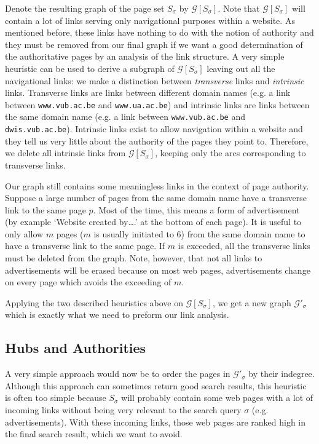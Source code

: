 \documentclass[a4paper,11pt]{report}
\newcommand{\graf}{\mathscr{G}}
\begin{document}
Denote the resulting graph of the page set $S_\sigma$ by $\graf[S_\sigma]$. Note that $\graf[S_\sigma]$ will 
contain 
a lot of links serving only navigational purposes within a website. As mentioned 
before, these links have nothing to do with the notion of authority and they must be 
removed from our final graph if we want a good determination of  the authoritative pages by an analysis of
 the link structure.  A very simple heuristic can be used to derive a subgraph 
 of $\graf[S_\sigma]$ leaving out all the navigational links: we make a 
 distinction between \emph{transverse} links and \emph{intrinsic} links. 
 Transverse links are links between different domain names (e.g. a link between \texttt{www.vub.ac.be} and
 \texttt{www.ua.ac.be}) and intrinsic links are links between the same domain 
 name (e.g. a link between \texttt{www.vub.ac.be} and
 \texttt{dwis.vub.ac.be}). Intrinsic links exist to allow navigation within a 
 website and they tell us very little about the authority of the pages they 
 point to. Therefore, we delete all intrinsic links from  $\graf[S_\sigma]$, 
 keeping only the arcs corresponding to transverse links.
 
Our graph still contains some meaningless links in the context of page 
 authority. Suppose a large number of pages from the same domain name have a transverse link to 
 the same page $p$. Most of the time, this means a form of advertisement (by example `Website created by\ldots.' at the bottom of each page). It is useful 
 to only allow $m$ pages ($m$ is usually initiated to 6) from the same domain name to have a transverse link to the same page. 
 If $m$ is exceeded, all the transverse links must be deleted from the graph. Note, 
 however, that not all links to advertisements will be erased because on most 
 web pages, advertisements change on every page which avoids the exceeding of $m$.
 
 Applying the two described heuristics above on $\graf[S_\sigma]$, we get a new 
 graph $\graf'_\sigma$ which is exactly what we need to preform our link analysis.
 
 \subsection{Hubs and Authorities} 
 A very simple approach would now be to order the pages in $\graf'_\sigma$ by 
 their indegree. Although this approach can sometimes return good search results, this
 heuristic is often too simple because $S_\sigma$ will probably contain some 
 web pages with a lot of incoming links without being very relevant to the search query $\sigma$ (e.g. advertisements).   
 With these incoming links, those web pages are ranked high in the final search 
 result, which we want to avoid.
\end{document}
